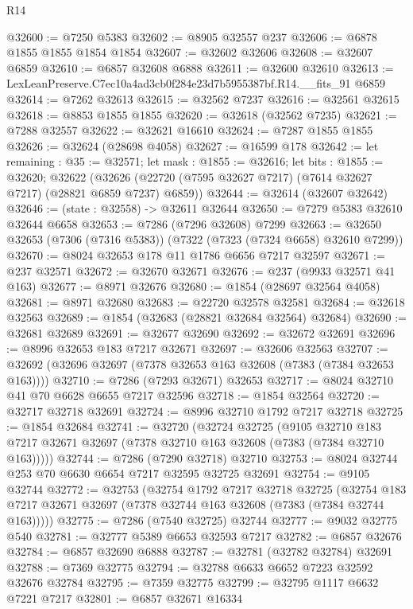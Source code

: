 \begin{lexlean}{R14}
\begin{coremodule}
@32600 := @7250 @5383
@32602 := @8905 @32557 @237
@32606 := @6878 @1855 @1855 @1854 @1854
@32607 := @32602 @32606
@32608 := @32607 @6859
@32610 := @6857 @32608 @6888
@32611 := @32600 @32610
@32613 := LexLeanPreserve.C7ec10a4ad3cb0f284e23d7b5955387bf.R14.__fits_91 @6859
@32614 := @7262 @32613
@32615 := @32562 @7237
@32616 := @32561 @32615
@32618 := @8853 @1855 @1855
@32620 := @32618 (@32562 @7235)
@32621 := @7288 @32557
@32622 := @32621 @16610
@32624 := @7287 @1855 @1855
@32626 := @32624 (@28698 @4058)
@32627 := @16599 @178
@32642 := let remaining : @35 := @32571;
  let mask : @1855 := @32616;
  let bits : @1855 := @32620;
  @32622 (@32626 (@22720 (@7595 @32627 @7217) (@7614 @32627 @7217) (@28821 @6859 @7237) @6859))
@32644 := @32614 (@32607 @32642)
@32646 := (state : @32558) -> @32611 @32644
@32650 := @7279 @5383 @32610 @32644 @6658
@32653 := @7286 (@7296 @32608) @7299
@32663 := @32650 @32653 (@7306 (@7316 @5383)) (@7322 (@7323 (@7324 @6658) @32610 @7299))
@32670 := @8024 @32653 @178 @11 @1786 @6656 @7217 @32597
@32671 := @237 @32571
@32672 := @32670 @32671
@32676 := @237 (@9933 @32571 @41 @163)
@32677 := @8971 @32676
@32680 := @1854 (@28697 @32564 @4058)
@32681 := @8971 @32680
@32683 := @22720 @32578 @32581
@32684 := @32618 @32563
@32689 := @1854 (@32683 (@28821 @32684 @32564) @32684)
@32690 := @32681 @32689
@32691 := @32677 @32690
@32692 := @32672 @32691
@32696 := @8996 @32653 @183 @7217 @32671
@32697 := @32606 @32563
@32707 := @32692 (@32696 @32697 (@7378 @32653 @163 @32608 (@7383 (@7384 @32653 @163))))
@32710 := @7286 (@7293 @32671) @32653
@32717 := @8024 @32710 @41 @70 @6628 @6655 @7217 @32596
@32718 := @1854 @32564
@32720 := @32717 @32718 @32691
@32724 := @8996 @32710 @1792 @7217 @32718
@32725 := @1854 @32684
@32741 := @32720
    (@32724
      @32725
      (@9105
        @32710
        @183
        @7217
        @32671
        @32697
        (@7378 @32710 @163 @32608 (@7383 (@7384 @32710 @163)))))
@32744 := @7286 (@7290 @32718) @32710
@32753 := @8024 @32744 @253 @70 @6630 @6654 @7217 @32595 @32725 @32691
@32754 := @9105 @32744
@32772 := @32753
    (@32754
      @1792
      @7217
      @32718
      @32725
      (@32754 @183 @7217 @32671 @32697 (@7378 @32744 @163 @32608 (@7383 (@7384 @32744 @163)))))
@32775 := @7286 (@7540 @32725) @32744
@32777 := @9032 @32775 @540
@32781 := @32777 @5389 @6653 @32593 @7217
@32782 := @6857 @32676
@32784 := @6857 @32690 @6888
@32787 := @32781 (@32782 @32784) @32691
@32788 := @7369 @32775
@32794 := @32788 @6633 @6652 @7223 @32592 @32676 @32784
@32795 := @7359 @32775
@32799 := @32795 @1117 @6632 @7221 @7217
@32801 := @6857 @32671 @16334

\end{coremodule}
\end{lexlean}

